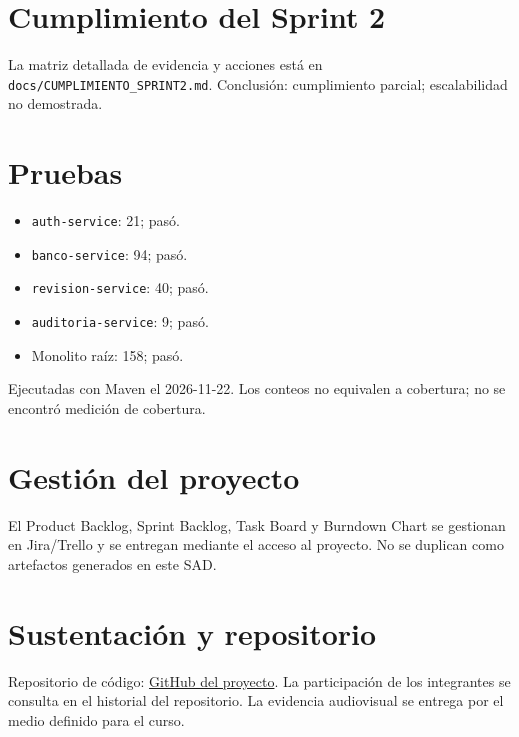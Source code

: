 \documentclass[12pt,a4paper]{article}
\begin{document}
\section{Cumplimiento del Sprint 2}
La matriz detallada de evidencia y acciones está en \texttt{docs/CUMPLIMIENTO\_SPRINT2.md}. Conclusión: cumplimiento parcial; escalabilidad no demostrada.

\section{Pruebas}
\begin{itemize}
\item \texttt{auth-service}: 21; pasó.
\item \texttt{banco-service}: 94; pasó.
\item \texttt{revision-service}: 40; pasó.
\item \texttt{auditoria-service}: 9; pasó.
\item Monolito raíz: 158; pasó.
\end{itemize}
Ejecutadas con Maven el 2026-11-22. Los conteos no equivalen a cobertura; no se encontró medición de cobertura.

\section{Gestión del proyecto}
El Product Backlog, Sprint Backlog, Task Board y Burndown Chart se gestionan en Jira/Trello y se entregan mediante el acceso al proyecto. No se duplican como artefactos generados en este SAD.

\section{Sustentación y repositorio}
Repositorio de código: \href{https://github.com/BastianRu/proyecto-saberpro-ing-software-II}{GitHub del proyecto}. La participación de los integrantes se consulta en el historial del repositorio. La evidencia audiovisual se entrega por el medio definido para el curso.
\end{document}
